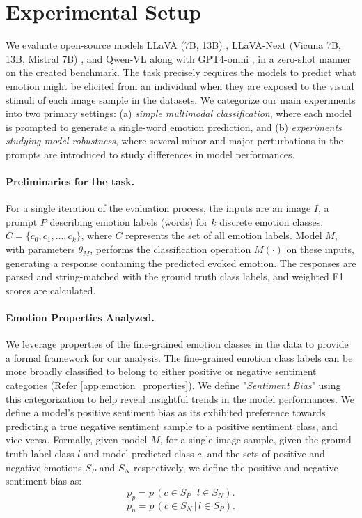 \section{Experimental Setup}
\label{sec:experiments}

We evaluate open-source models LLaVA (7B, 13B) \cite{liu2024visual}, LLaVA-Next (Vicuna 7B, 13B, Mistral 7B) \cite{liu2024llavanext}, and Qwen-VL \cite{bai2023qwen} along with GPT4-omni \cite{achiam2023gpt}, in a zero-shot manner on the created benchmark. The task precisely requires the models to predict what emotion might be elicited from an individual when they are exposed to the visual stimuli of each image sample in the datasets. We categorize our main experiments into two primary settings: (a) \textit{simple multimodal classification}, where each model is prompted to generate a single-word emotion prediction, and (b) \textit{experiments studying model robustness}, where several minor and major perturbations in the prompts are introduced to study differences in model performances. 

\paragraph{Preliminaries for the task.} For a single iteration of the evaluation process, the inputs are an image \(I\), a prompt \(P\) describing emotion labels (words) for \(k\) discrete emotion classes, \(C = \{c_0, c_1, ... , c_k\}\), where \(C\) represents the set of all emotion labels. Model \(M\), with parameters \(\theta_{M}\), performs the classification operation \(M(\cdot)\) on these inputs, generating a response containing the predicted evoked emotion. The responses are parsed and string-matched with the ground truth class labels, and weighted F1 scores are calculated.

\paragraph{Emotion Properties Analyzed.} We leverage properties of the fine-grained emotion classes in the data to provide a formal framework for our analysis. The fine-grained emotion class labels can be more broadly classified to belong to either positive or negative \underline{sentiment} categories (Refer \ref{app:emotion_properties}). We define "\textit{Sentiment Bias}" using this categorization to help reveal insightful trends in the model performances. We define a model's positive sentiment bias as its exhibited preference towards predicting a true negative sentiment sample to a positive sentiment class, and vice versa. Formally, given model \(M\), for a single image sample, given the ground truth label class \(l\) and model predicted class \(c\), and the sets of positive and negative emotions \(S_P\) and \(S_N\) respectively, we define the positive and negative sentiment bias as:
    \begin{equation}
        p_p = p\,(c \in S_P\, |\, l \in S_N).
    \end{equation}
    \begin{equation}
        p_n = p\,(c \in S_N\, |\, l \in S_P).
    \end{equation}


